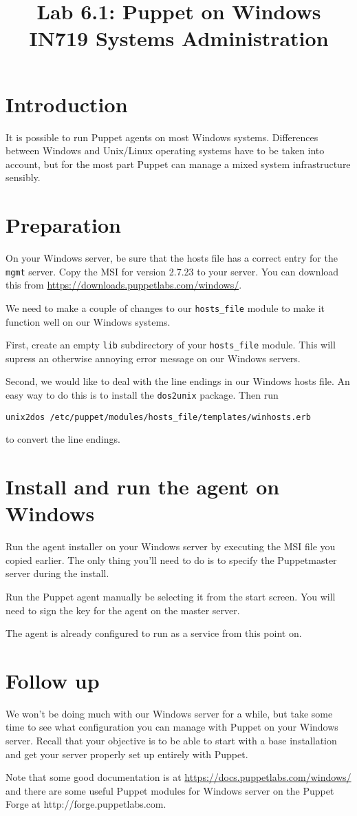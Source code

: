 \documentclass{article}   	%
\title{Lab 6.1:  Puppet on Windows\\ IN719 Systems Administration}
\date{}							%
\begin{document}
\maketitle

\section*{Introduction}
It is possible to run Puppet agents on most Windows systems.  Differences between Windows and Unix/Linux operating systems have to be taken into account, but for the most part Puppet can manage a mixed system infrastructure sensibly.

\section{Preparation}
On your Windows server, be sure that the hosts file has a correct entry for the \texttt{mgmt} server.  Copy the MSI for version 2.7.23 to your server. You can download this from \url{https://downloads.puppetlabs.com/windows/}.

We need to make a couple of changes to our \texttt{hosts\_file} module to make it function well on our Windows systems.

First, create an empty \texttt{lib} subdirectory of your \texttt{hosts\_file} module.  This will supress an otherwise annoying error message on our Windows servers.

Second, we would like to deal with the line endings in our Windows hosts file.  An easy way to do this is to install the \texttt{dos2unix} package.  Then run

\texttt{unix2dos /etc/puppet/modules/hosts\_file/templates/winhosts.erb}

to convert the line endings.

\section{Install and run the agent on Windows}
Run the agent installer on your Windows server by executing the MSI file you copied earlier.  The only thing you'll need to do is to specify the Puppetmaster server during the install.

Run the Puppet agent manually be selecting it from the start screen. You will need to sign the key for the agent on the master server.

The agent is already configured to run as a service from this point on.

\section{Follow up}
We won't be doing much with our Windows server for a while, but take some time to see what configuration you can manage with Puppet on your Windows server.  Recall that your objective is to be able to start with a base installation and get your server properly set up entirely with Puppet.

Note that some good documentation is at \url{https://docs.puppetlabs.com/windows/} and there are some useful Puppet modules for Windows server on the Puppet Forge at http://forge.puppetlabs.com.
\end{document}
